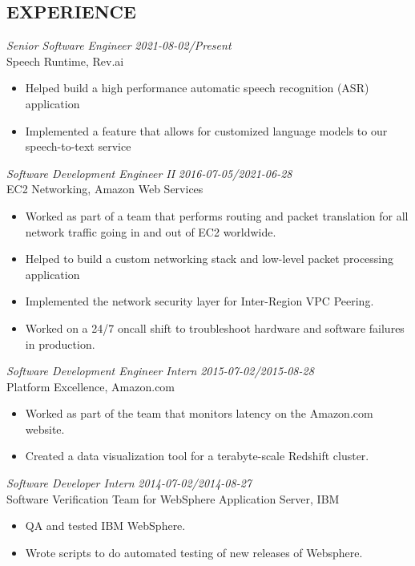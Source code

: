 \documentclass[overlapped, 10pt]{res} %
\begin{document}
\begin{resume}
 
\section{EXPERIENCE}

{\sl Senior Software Engineer} \hfill {\sl 2021-08-02/Present} \\
Speech Runtime, Rev.ai
\begin{itemize} \itemsep -2pt %
    \item Helped build a high performance automatic speech recognition (ASR) application
    \item Implemented a feature that allows for customized language models to our speech-to-text service
\end{itemize}
{\sl Software Development Engineer II} \hfill {\sl 2016-07-05/2021-06-28} \\
EC2 Networking, Amazon Web Services
\begin{itemize} \itemsep -2pt %
    \item Worked as part of a team that performs routing and packet translation for all network traffic going in and out of EC2 worldwide.
    \item Helped to build a custom networking stack and low-level packet processing application
    \item Implemented the network security layer for Inter-Region VPC Peering.
    \item Worked on a 24/7 oncall shift to troubleshoot hardware and software failures in production.
\end{itemize}
{\sl Software Development Engineer Intern} \hfill {\sl 2015-07-02/2015-08-28} \\
Platform Excellence, Amazon.com
\begin{itemize} \itemsep -2pt %
    \item Worked as part of the team that monitors latency on the Amazon.com website.
    \item Created a data visualization tool for a terabyte-scale Redshift cluster.
\end{itemize}
{\sl Software Developer Intern} \hfill {\sl 2014-07-02/2014-08-27} \\
Software Verification Team for WebSphere Application Server, IBM
\begin{itemize} \itemsep -2pt %
    \item QA and tested IBM WebSphere.
    \item Wrote scripts to do automated testing of new releases of Websphere.
\end{itemize}
 


\end{resume}
\end{document}
